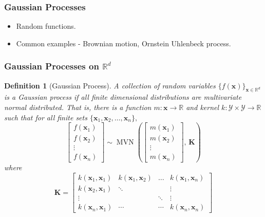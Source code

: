 \documentclass{beamer}
\DeclareMathOperator{\MVN}{MVN}
\newcommand{\R}{\mathbb{R}}
\newtheorem{definnn}{Definition}
\begin{document}
\begin{frame}
    \frametitle{Gaussian Processes}
    \begin{itemize}
        \item Random functions.
        \item Common examples - Brownian motion, Ornstein Uhlenbeck process.
    \end{itemize}
\end{frame}

\begin{frame}
    \frametitle{Gaussian Processes on $\mathbb{R}^d$}
    \begin{definnn}[Gaussian Process]
        A collection of random variables $\{f(\mathbf{x})\}_{\mathbf{x}\in\mathbb{R}^d}$
        is a \emph{Gaussian process} if all finite dimensional distributions are
        multivariate normal distributed. That is, there is a function
        $m:\mathcal{\mathbf{x}}\to\R$ and kernel $k:\mathcal{Y}\times\mathcal{Y}\to \R$
        such that for all finite sets $\{\mathbf{x}_1, \mathbf{x}_2, \dots, \mathbf{x}_n\},$
        $$\begin{bmatrix}
                f(\mathbf{x}_1) \\ f(\mathbf{x}_2)\\ \vdots\\ f(\mathbf{x}_n)
            \end{bmatrix} \sim
            \MVN\left(\begin{bmatrix}
                m(\mathbf{x}_1) \\ m(\mathbf{x}_2)\\ \vdots\\ m(\mathbf{x}_n)
            \end{bmatrix},\, \mathbf{K}\right)$$
        where $$\mathbf{K} = \begin{bmatrix}
                k(\mathbf{x}_1, \mathbf{x}_1) & k(\mathbf{x}_1, \mathbf{x}_2) & \dots  & k(\mathbf{x}_1, \mathbf{x}_n) \\
                k(\mathbf{x}_2, \mathbf{x}_1) & \ddots                        &        & \vdots                        \\
                \vdots                        &                               & \ddots & \vdots                        \\
                k(\mathbf{x}_n, \mathbf{x}_1) & \cdots                        & \cdots & k(\mathbf{x}_n, \mathbf{x}_n)
            \end{bmatrix}$$
    \end{definnn}
\end{frame}
\end{document}

